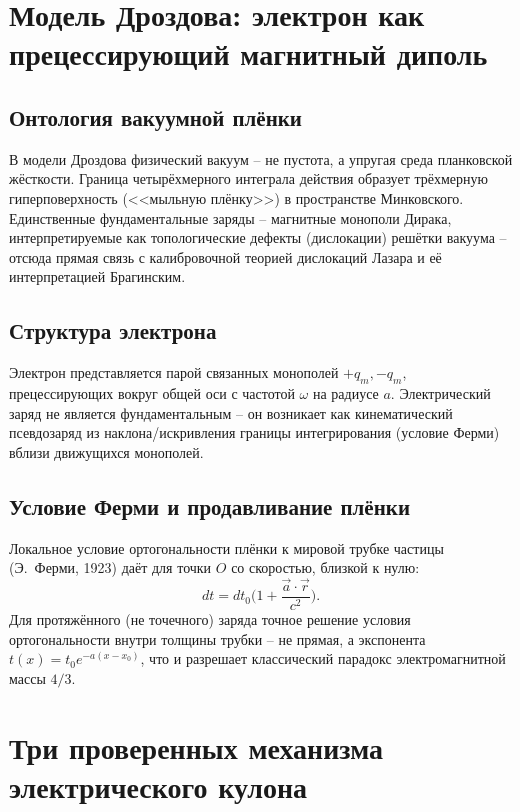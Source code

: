 \documentclass[12pt,a4paper]{article}
\begin{document}
\section{Модель Дроздова: электрон как прецессирующий магнитный диполь}

\subsection{Онтология вакуумной плёнки}

В модели Дроздова физический вакуум -- не пустота, а упругая среда
планковской жёсткости. Граница четырёхмерного интеграла действия
образует трёхмерную гиперповерхность (<<мыльную плёнку>>) в
пространстве Минковского. Единственные фундаментальные заряды --
магнитные монополи Дирака, интерпретируемые как топологические дефекты
(дислокации) решётки вакуума -- отсюда прямая связь с калибровочной
теорией дислокаций Лазара и её интерпретацией Брагинским.

\subsection{Структура электрона}

Электрон представляется парой связанных монополей $+q_m,-q_m$,
прецессирующих вокруг общей оси с частотой $\omega$ на радиусе $a$.
Электрический заряд не является фундаментальным -- он возникает как
кинематический псевдозаряд из наклона/искривления границы
интегрирования (условие Ферми) вблизи движущихся монополей.

\subsection{Условие Ферми и продавливание плёнки}

Локальное условие ортогональности плёнки к мировой трубке частицы
(Э.~Ферми, 1923) даёт для точки $O$ со скоростью, близкой к нулю:
\begin{equation}
dt = dt_0\Big(1+\frac{\vec a\cdot\vec r}{c^2}\Big).
\end{equation}
Для протяжённого (не точечного) заряда точное решение условия
ортогональности внутри толщины трубки -- не прямая, а экспонента
$t(x)=t_0 e^{-a(x-x_0)}$, что и разрешает классический парадокс
электромагнитной массы $4/3$.

\section{Три проверенных механизма электрического кулона}
\end{document}
